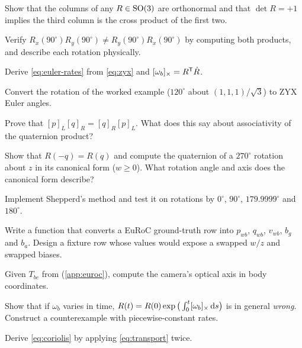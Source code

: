 \begin{exercises}
  \item Show that the columns of any $R \in \mathrm{SO}(3)$ are orthonormal and that $\det R = +1$ implies the third column is the cross product of the first two.
  \item Verify $R_x(90^\circ)R_y(90^\circ) \neq R_y(90^\circ)R_x(90^\circ)$ by computing both products, and describe each rotation physically.
  \item Derive \eqref{eq:euler-rates} from \eqref{eq:zyx} and $[\omega_b]_{\times} = R^{\mathsf{T}}\dot R$.
  \item Convert the rotation of the worked example ($120^\circ$ about $(1,1,1)/\sqrt3$) to ZYX Euler angles.
  \item Prove that $[p]_L[q]_R = [q]_R[p]_L$. What does this say about associativity of the quaternion product?
  \item Show that $R(-q) = R(q)$ and compute the quaternion of a $270^\circ$ rotation about $z$ in its canonical form ($w \ge 0$). What rotation angle and
        axis does the canonical form describe?
  \item Implement Shepperd's method and test it on rotations by $0^\circ$, $90^\circ$, $179.9999^\circ$ and $180^\circ$.
  \item Write a function that converts a EuRoC ground-truth row into $p_{wb}$, $q_{wb}$, $v_{wb}$, $b_g$ and $b_a$. Design a fixture row whose values would
        expose a swapped $w/z$ and swapped biases.
  \item Given $T_{bc}$ from  (\cref{app:euroc}), compute the camera's optical axis in body coordinates.
  \item Show that if $\omega_b$ varies in time, $R(t) = R(0)\exp\big(\int_0^t[\omega_b]_{\times}\,\mathrm{d} s\big)$ is in general \emph{wrong}. Construct a counterexample with
        piecewise-constant rates.
  \item Derive \eqref{eq:coriolis} by applying \eqref{eq:transport} twice.
\end{exercises}

